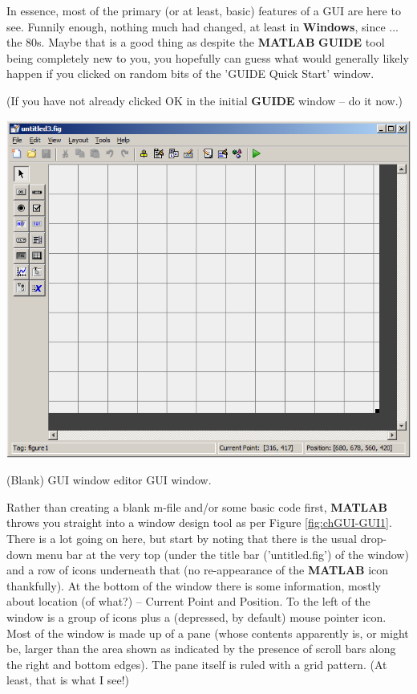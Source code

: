 \documentclass{tufte-book} %
\begin{document}
In essence, most of the primary (or at least, basic) features of a GUI are here to see. Funnily enough, nothing much had changed, at least in \textbf{Windows}, since ... the 80s. Maybe that is a good thing as despite the \textbf{MATLAB} \textbf{GUIDE} tool being completely new to you, you hopefully can guess what would generally likely happen if you clicked on random bits of the '\textsf{GUIDE Quick Start}' window.

(If you have not already clicked \textsf{OK} in the initial \textbf{GUIDE} window -- do it now.)

\begin{marginfigure}[0.0in]
\includegraphics[width=\linewidth]{chGUI-GUI1.png}
\caption{(Blank) GUI window editor GUI window.}
\label{fig:chGUI-GUI1}
\end{marginfigure}

Rather than creating a blank \textsf{m-file} and/or some basic code first, \textbf{MATLAB}  throws you straight into a window design tool as per Figure \ref{fig:chGUI-GUI1}. There is a lot going on here, but start by noting that there is the usual drop-down menu bar at the very top (under the title bar ('\textsf{untitled.fig}') of the window) and a row of icons underneath that (no re-appearance of the \textbf{MATLAB} icon thankfully). At the bottom of the window there is some information, mostly about location (of what?) -- \textsf{Current Point }and \textsf{Position}. To the left of the window is a group of icons plus a (depressed, by default) mouse pointer icon. Most of the window is made up of a pane (whose contents apparently is, or might be, larger than the area shown as indicated by the presence of scroll bars along the right and bottom edges). The pane itself is ruled with a grid pattern. (At least, that is what I see!)
\end{document}

